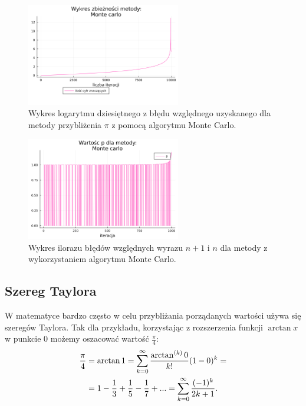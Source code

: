 \begin{figure}[!h]\centering
\renewcommand{\figurename}{Wykres}
\includegraphics[width=0.6\textwidth]{../prog/monte_carlo_log_error.png}
\caption{Wykres logarytmu dziesiętnego z błędu względnego uzyskanego dla metody przybliżenia $\pi$ z pomocą algorytmu Monte Carlo.}
\label{monte-carlo-error}
\end{figure}

\begin{figure}[!h]\centering
    \renewcommand{\figurename}{Wykres}
    \includegraphics[width=0.6\textwidth]{../prog/monte_carlo_error_ratio.png}
    \caption{Wykres ilorazu błędów względnych wyrazu $n+1$ i $n$ dla metody z wykorzystaniem algorytmu Monte Carlo.}
    \label{monte-carlo-convergence}
\end{figure}


\subsection{Szereg Taylora}
W matematyce bardzo często w celu przybliżania porządanych wartości używa się szeregów Taylora. Tak dla przykładu, korzystając z rozszerzenia funkcji $\arctan x$ w punkcie $0$ możemy oszacować wartość $\frac\pi4$:
\begin{equation}
\begin{split}
    \frac\pi4&=\arctan1=\sum\limits_{k=0}^\infty{\arctan^{(k)}0\over k!}(1-0)^k=\\
    &=1-\frac13+\frac15-\frac17+...=\sum\limits_{k=0}^\infty{(-1)^k\over 2k+1}.
\end{split}
\end{equation}

